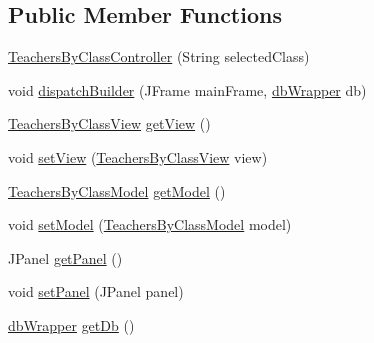 \subsection*{Public Member Functions}
\begin{DoxyCompactItemize}
\item 
\mbox{\hyperlink{classcom_1_1_b_n_u_1_1pages_1_1teachers_by_class_1_1_teachers_by_class_controller_a7766424f098a93b3b75be4b51b6e05ef}{Teachers\+By\+Class\+Controller}} (String selected\+Class)
\item 
void \mbox{\hyperlink{classcom_1_1_b_n_u_1_1pages_1_1teachers_by_class_1_1_teachers_by_class_controller_a7ae16bee2d28983fd88bcc67a97dd1b1}{dispatch\+Builder}} (J\+Frame main\+Frame, \mbox{\hyperlink{interfacecom_1_1_b_n_u_1_1database_1_1db_wrapper}{db\+Wrapper}} db)
\item 
\mbox{\hyperlink{classcom_1_1_b_n_u_1_1pages_1_1teachers_by_class_1_1_teachers_by_class_view}{Teachers\+By\+Class\+View}} \mbox{\hyperlink{classcom_1_1_b_n_u_1_1pages_1_1teachers_by_class_1_1_teachers_by_class_controller_a4f013de9da31a14938e2b91560c1af05}{get\+View}} ()
\item 
void \mbox{\hyperlink{classcom_1_1_b_n_u_1_1pages_1_1teachers_by_class_1_1_teachers_by_class_controller_ab74a04c91554f77e5ba1a59762e63fd9}{set\+View}} (\mbox{\hyperlink{classcom_1_1_b_n_u_1_1pages_1_1teachers_by_class_1_1_teachers_by_class_view}{Teachers\+By\+Class\+View}} view)
\item 
\mbox{\hyperlink{classcom_1_1_b_n_u_1_1pages_1_1teachers_by_class_1_1_teachers_by_class_model}{Teachers\+By\+Class\+Model}} \mbox{\hyperlink{classcom_1_1_b_n_u_1_1pages_1_1teachers_by_class_1_1_teachers_by_class_controller_a672ef3bf1822addc2af01533e462cb37}{get\+Model}} ()
\item 
void \mbox{\hyperlink{classcom_1_1_b_n_u_1_1pages_1_1teachers_by_class_1_1_teachers_by_class_controller_a30b76a4b696773deebd887cfd5849abd}{set\+Model}} (\mbox{\hyperlink{classcom_1_1_b_n_u_1_1pages_1_1teachers_by_class_1_1_teachers_by_class_model}{Teachers\+By\+Class\+Model}} model)
\item 
J\+Panel \mbox{\hyperlink{classcom_1_1_b_n_u_1_1pages_1_1teachers_by_class_1_1_teachers_by_class_controller_a1f3adbed0965099ef1a4ac8a21dad9d7}{get\+Panel}} ()
\item 
void \mbox{\hyperlink{classcom_1_1_b_n_u_1_1pages_1_1teachers_by_class_1_1_teachers_by_class_controller_a2f91a284e99468e4b6ff94f8fea2093e}{set\+Panel}} (J\+Panel panel)
\item 
\mbox{\hyperlink{interfacecom_1_1_b_n_u_1_1database_1_1db_wrapper}{db\+Wrapper}} \mbox{\hyperlink{classcom_1_1_b_n_u_1_1pages_1_1teachers_by_class_1_1_teachers_by_class_controller_a8b13aa5a8eeefe16c27e3bcb0faab956}{get\+Db}} ()

\end{DoxyCompactItemize}
